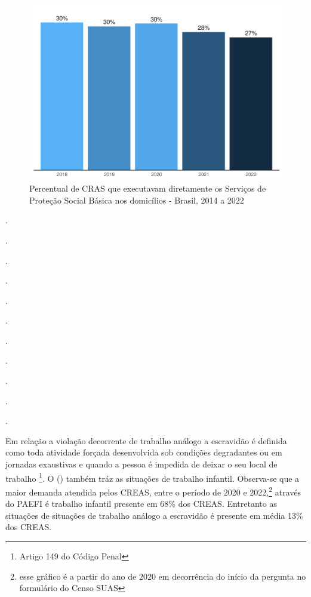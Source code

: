 \documentclass[
  brazilian]{report}
\begin{document}
\begin{figure}
\includegraphics{Censo-SUAS-2022_files/figure-latex/CRAS-PSB-1} \caption[Percentual de CRAS que executavam diretamente os Serviços de Proteção Social Básica nos domicílios - Brasil, 2014 a 2022]{Percentual de CRAS que executavam diretamente os Serviços de Proteção Social Básica nos domicílios - Brasil, 2014 a 2022}\label{fig:CRAS-PSB}
\end{figure}

.

.

.

.

.

.

.

.

.

.

.

Em relação a violação decorrente de trabalho análogo a escravidão é
definida como toda atividade forçada desenvolvida sob condições
degradantes ou em jornadas exaustivas e quando a pessoa é impedida de
deixar o seu local de trabalho \footnote{Artigo 149 do Código Penal}. O
() também tráz as situações de trabalho infantil.
Observa-se que a maior demanda atendida pelos CREAS, entre o período de
2020 e
2022,\footnote{esse gráfico é a partir do ano de 2020 em decorrência do início da pergunta no formulário do Censo SUAS}
através do PAEFI é trabalho infantil presente em 68\% dos CREAS.
Entretanto as situações de situações de trabalho análogo a escravidão é
presente em média 13\% dos CREAS.
\end{document}
